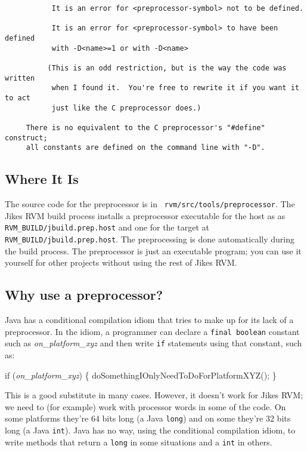 \begin{verbatim}
           It is an error for <preprocessor-symbol> not to be defined.

           It is an error for <preprocessor-symbol> to have been defined
           with -D<name>=1 or with -D<name>

          (This is an odd restriction, but is the way the code was written
           when I found it.  You're free to rewrite it if you want it to act
           just like the C preprocessor does.)

     There is no equivalent to the C preprocessor's "#define" construct;
     all constants are defined on the command line with "-D".
\end{verbatim}

\subsection{Where It Is}

The source code for the preprocessor is in {\tt
  rvm/src/tools/preprocessor}.  The Jikes RVM build process installs a
preprocessor executable for the host as as {\tt
  RVM\_BUILD/jbuild.prep.host} and one for the target at {\tt
  RVM\_BUILD/jbuild.prep.host}.  The preprocessing is done
automatically during the build process.  The preprocessor is just an
executable program; you can use it yourself for other projects without
using the rest of Jikes RVM.


\subsection{Why use a preprocessor?}

Java has a conditional compilation idiom that tries to make up for its
lack of a preprocessor.  In the idiom, a programmer can
declare a {\tt final boolean} constant such as {\it on\_platform\_xyz}
and then write {\tt if} statements using that constant, such as:
\begin{example}
if ({\it on\_platform\_xyz}) \{
   doSomethingIOnlyNeedToDoForPlatformXYZ();
\}    
\end{example}

This is a good substitute in many cases.  However, it doesn't work for
Jikes RVM; we need to (for example) work with processor words in some of
the code.  On some platforms they're 64 bits long (a Java {\tt long})
and on some they're 32 bits long (a Java {\tt int}).  Java has no way,
using the conditional compilation idiom, to write methods that return
a {\tt long} in some situations and a {\tt int} in others.

